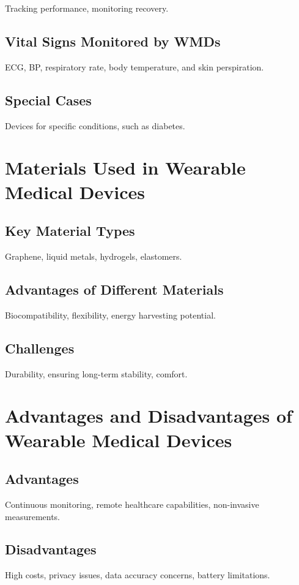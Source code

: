 \documentclass[journal]{IEEEtran}
\begin{document}
Tracking performance, monitoring recovery.

\subsection{Vital Signs Monitored by WMDs}

ECG, BP, respiratory rate, body temperature, and skin perspiration.

\subsection{Special Cases}

Devices for specific conditions, such as diabetes.

\section{Materials Used in Wearable Medical Devices}

\subsection{Key Material Types}

Graphene, liquid metals, hydrogels, elastomers.

\subsection{Advantages of Different Materials}

Biocompatibility, flexibility, energy harvesting potential.

\subsection{Challenges}

Durability, ensuring long-term stability, comfort.

\section{Advantages and Disadvantages of Wearable Medical Devices}

\subsection{Advantages}
Continuous monitoring, remote healthcare capabilities, non-invasive measurements.

\subsection{Disadvantages}
High costs, privacy issues, data accuracy concerns, battery limitations.
\end{document}
